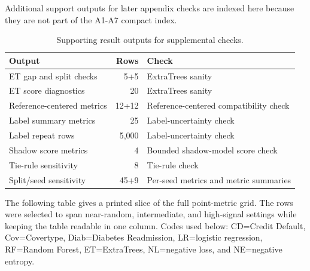 \documentclass[
  10pt,
  twocolumn]{article}
\begin{document}
Additional support outputs for later appendix checks are indexed here because they are not part of the A1-A7 compact index.

\begin{table}[H]
\centering
\scriptsize
\caption{Supporting result outputs for supplemental checks.}
\label{tab:appendix-support-output-index}
\begin{tabularx}{\columnwidth}{l r Y}
\toprule
Output & Rows & Check \\
\midrule
ET gap and split checks & 5+5 & ExtraTrees sanity \\
ET score diagnostics & 20 & ExtraTrees sanity \\
Reference-centered metrics & 12+12 & Reference-centered compatibility check \\
Label summary metrics & 25 & Label-uncertainty check \\
Label repeat rows & 5,000 & Label-uncertainty check \\
Shadow score metrics & 4 & Bounded shadow-model score check \\
Tie-rule sensitivity & 8 & Tie-rule check \\
Split/seed sensitivity & 45+9 & Per-seed metrics and metric summaries \\
\bottomrule
\end{tabularx}
\end{table}

The following table gives a printed slice of the full point-metric grid. The rows were selected to span near-random, intermediate, and high-signal settings while keeping the table readable in one column. Codes used below: CD=Credit Default, Cov=Covertype, Diab=Diabetes Readmission, LR=logistic regression, RF=Random Forest, ET=ExtraTrees, NL=negative loss, and NE=negative entropy.
\end{document}
